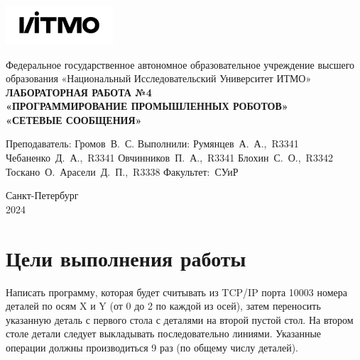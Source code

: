 \documentclass[a4paper, 12pt]{article}
\begin{document}
    \begin{titlepage}

        \begin{center}
        \includegraphics[width=0.3\textwidth]{itmo.png} %
        \vfill
        
        Федеральное государственное автономное образовательное учреждение высшего образования
        «Национальный Исследовательский Университет ИТМО»\\
        
        \vfill
        {\large\bf ЛАБОРАТОРНАЯ РАБОТА №4}\\
        {\large\bf «ПРОГРАММИРОВАНИЕ ПРОМЫШЛЕННЫХ РОБОТОВ»}\\
        {\large\bf «СЕТЕВЫЕ СООБЩЕНИЯ»}
        \vfill

        \begin{flushright}
            \begin{minipage}{.45\textwidth}
            {
                \hbox{Преподаватель:}
                \hbox{Громов В. С.}
                \hbox{}
                \hbox{Выполнили:}
                \hbox{Румянцев А. А., R3341}
                \hbox{Чебаненко Д. А., R3341}
                \hbox{Овчинников П. А., R3341}
                \hbox{Блохин С. О., R3342}
                \hbox{Тоскано О. Арасели Д. П., R3338}
                \hbox{}
                \hbox{Факультет: СУиР}
            }
            \end{minipage}
        \end{flushright}
        
        \vfill
                
        Санкт-Петербург\\
        2024
        \end{center}
    \end{titlepage}
    
    \tableofcontents

    \newpage
    \section{Цели выполнения работы}
    Написать программу, которая будет считывать из TCP/IP порта 10003
    номера деталей по осям X и Y (от 0 до 2 по каждой из осей), затем
    переносить указанную деталь с первого стола с деталями на второй
    пустой стол. На втором столе детали следует выкладывать
    последовательно линиями. Указанные операции должны производиться
    9 раз (по общему числу деталей).
\end{document}
